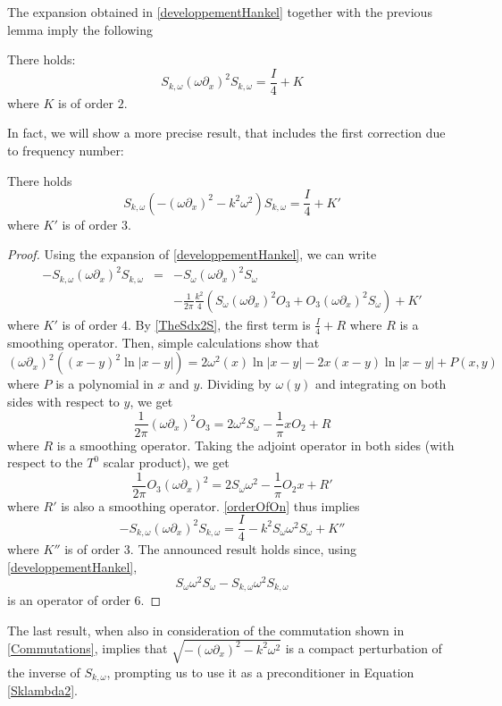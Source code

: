 \documentclass[a4paper]{article}
\begin{document}
	The expansion obtained in \autoref{developpementHankel} together with the previous lemma imply the following
	\begin{The} There holds:
		\[S_{k,\omega}  (\omega\partial_x)^2 S_{k,\omega} = \frac{I}{4} + K\]
		where $K$ is of order $2$. 
	\end{The}
	
	In fact, we will show a more precise result, that includes the first correction due to frequency number:
	\begin{The} There holds
		\label{TheHelmholtz}
		\[S_{k,\omega} \left( -(\omega \partial_x)^2 - k^2\omega^2\right) S_{k,\omega} = \frac{I}{4} + K'\]
		where $K'$ is of order $3$. 
		\begin{proof}
			Using the expansion of \autoref{developpementHankel}, we can write 
			\begin{eqnarray*}
				-S_{k,\omega}(\omega \partial_x)^2 S_{k,\omega} &=& -S_\omega (\omega \partial_x)^2 S_\omega \\
				&& - \frac{1}{2\pi}\frac{k^2}{4}\left(S_\omega (\omega \partial_x)^2 O_3 + O_3 (\omega \partial_x)^2 S_\omega\right) + K'
			\end{eqnarray*}
			where $K'$ is of order $4$. By \autoref{TheSdx2S}, the first term is $\frac{I}{4} + R$ where $R$ is a smoothing operator. Then, simple calculations show that
			\[(\omega \partial_x)^2 \left((x - y)^2\ln|x-y|\right) = 2 \omega^2(x)\ln|x-y| -2x(x-y) \ln|x-y| + P(x,y)\]
			where $P$ is a polynomial in $x$ and $y$. Dividing by $\omega(y)$ and integrating on both sides with respect to $y$, we get 
			\[\frac{1}{2\pi}(\omega \partial_x)^2 O_3 = 2 \omega^2 S_\omega - \frac{1}{\pi}xO_2 + R \]
			where $R$ is a smoothing operator. Taking the adjoint operator in both sides (with respect to the $T^0$ scalar product), we get
			\[\frac{1}{2\pi}O_3(\omega \partial_x)^2 = 2 S_\omega\omega^2 - \frac{1}{\pi}O_2x + R'\]
			where $R'$ is also a smoothing operator. \autoref{orderOfOn} thus implies
			\[-S_{k,\omega}(\omega \partial_x)^2 S_{k,\omega} = \frac{I}{4} - k^2S_\omega \omega^2 S_\omega + K''\]
			where $K''$ is of order $3$.
			The announced result holds since, using \autoref{developpementHankel}, 
			\[S_\omega \omega^2 S_\omega - S_{k,\omega} \omega^2 S_{k,\omega}\]
			is an operator of order $6$.
		\end{proof}
	\end{The}
	
	
	The last result, when also in consideration of the commutation shown in \autoref{Commutations}, implies that $\sqrt{ -(\omega \partial_x)^2 - k^2\omega^2}$ is a compact perturbation of the inverse of $S_{k,\omega}$, prompting us to use it as a preconditioner in Equation \eqref{Sklambda2}.
	
\end{document}
